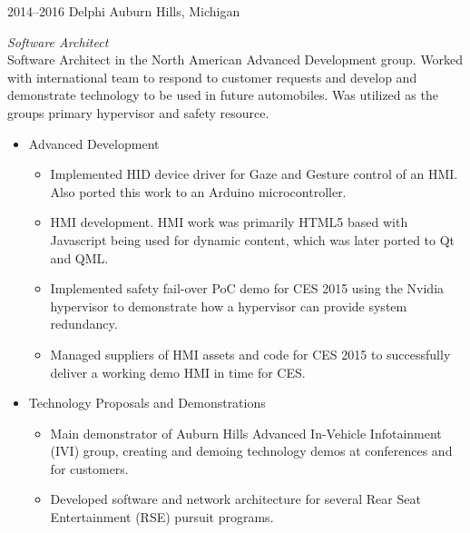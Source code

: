 \documentclass[print]{template/friggeri-cv} %
\begin{document}
\begin{entrylist}

\entry
{2014--2016}
{Delphi}
{Auburn Hills, Michigan}
{\emph{Software Architect} \\
Software Architect in the North American Advanced Development group.  Worked with international team to respond to customer requests and develop and demonstrate technology to be used in future automobiles.  Was utilized as the groups primary hypervisor and safety resource.
\begin{itemize}
\item Advanced Development
\begin{itemize}
\item Implemented HID device driver for Gaze and Gesture control of an HMI.  Also ported this work to an Arduino microcontroller.
\item HMI development.  HMI work was primarily HTML5 based with Javascript being used for dynamic content, which was later ported to Qt and QML.
\item Implemented safety fail-over PoC demo for CES 2015 using the Nvidia hypervisor to demonstrate how a hypervisor can provide system redundancy.
\item Managed suppliers of HMI assets and code for CES 2015 to successfully deliver a working demo HMI in time for CES.
\end{itemize}
\item Technology Proposals and Demonstrations
\begin{itemize}
\item Main demonstrator of Auburn Hills Advanced In-Vehicle Infotainment (IVI) group, creating and demoing technology demos at conferences and for customers.
\item Developed software and network architecture for several Rear Seat Entertainment (RSE) pursuit programs.
\end{itemize}
\end{itemize}}

\end{entrylist}

\newpage
\end{document}
